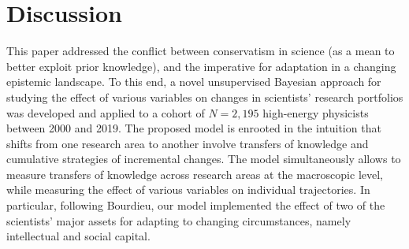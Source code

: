 \documentclass{article}
\begin{document}



\section{Discussion}

This paper addressed the conflict between conservatism in science (as a mean to better exploit prior knowledge), and the imperative for adaptation in a changing epistemic landscape. To this end, a novel unsupervised Bayesian approach for studying the effect of various variables on changes in scientists' research portfolios was developed and applied to a cohort of $N=2,195$ high-energy physicists between 2000 and 2019. The proposed model is enrooted in the intuition that shifts from one research area to another involve transfers of knowledge and cumulative strategies of incremental changes. The model simultaneously allows to measure transfers of knowledge across research areas at the macroscopic level, while measuring the effect of various variables on individual trajectories. In particular, following Bourdieu, our model implemented the effect of two of the scientists' major assets for adapting to changing circumstances, namely intellectual and social capital.


\end{document}
